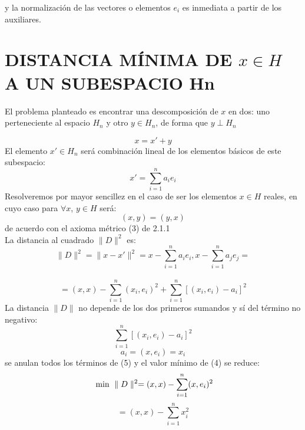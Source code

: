 y la normalización de las vectores o elementos $ e_{i} $ es inmediata a partir de los auxiliares.
\section{ DISTANCIA MÍNIMA DE $x \in H$ A UN SUBESPACIO Hn}

El problema planteado es encontrar una descomposición de $ x $ en dos: uno perteneciente al espacio $ H_{n} $ y otro $ y \in H_{n} $, de forma que $ y \perp H_{n} $

	\setcounter{equation}{0}%
	
\begin{equation}
x = x' + y
\end{equation}
El elemento $ x' \in H_{n} $ será combinación lineal de los elementos básicos de este
subespacio:
\begin{equation}
x' = \sum_{i = 1}^{n} a_{i}e_{i}
\end{equation}
Resolveremos por mayor sencillez en el caso de ser los elementos $ x \in H $ reales, en
cuyo caso para $ \forall x$, $ y \in H $ será:
\begin{equation}
		(x, y ) = (y, x )
\end{equation}
de acuerdo con el axioma métrico (3) de 2.1.1 \\

La distancia al cuadrado $ \parallel D \parallel ^{2} $ es:
\[ \parallel D \parallel^{2} = \parallel x - x' \parallel^{2} = x - \sum_{i = 1}^{n} a_{i}e_{i}, x - \sum_{i = 1}^{n} a_{j}e_{j} =\] \\
\begin{equation}
		= (x, x) - \sum_{i = 1}^{n} (x_{i}, e_{i})^{2} + \sum_{i = 1}^{n} [(x_{i},e_{i})  - a_{i}]^{2}
\end{equation}
La distancia $\parallel D \parallel$ no depende de los dos primeros sumandos y sí del término no
negativo:
\begin{equation}
	 \sum_{i = 1}^{n} [(x_{i},e_{i})  - a_{i}]^{2}
\end{equation}
\begin{equation}
a_{i} = (x, e_{i})  = x_{i}
\end{equation}
se anulan todos los términos de (5) y el valor mínimo de (4) se reduce:
\begin{equation}
\text{ min }  \parallel D \parallel ^{2} = (x, x) -  \sum_{i = 1}^{n} (x, e_{i}) ^{2}\\
\end{equation}
\[ = (x, x) -  \sum_{i = 1}^{n} x_{i}^{2} \]

